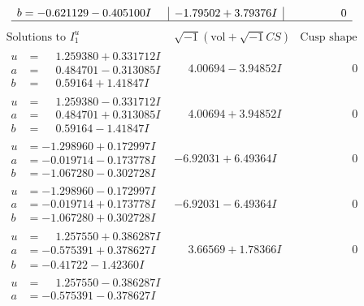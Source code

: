 \documentclass[1p]{elsarticle_modified}
\theoremstyle{definition}
\newcommand{\I}{\sqrt{-1}}
\begin{document}
$$\begin{array}{c|c|c}
\begin{aligned}
b &= -0.621129 - 0.405100 I\end{aligned}
 & -1.79502 + 3.79376 I & \phantom{-0.000000 } 0\\
 \hline 
 \end{array}$$\newpage$$\begin{array}{c|c|c}  
\text{Solutions to }I^u_{1}& \I (\text{vol} + \sqrt{-1}CS) & \text{Cusp shape}\\
 \hline 
\begin{aligned}
u &= \phantom{-}1.259380 + 0.331712 I \\
a &= \phantom{-}0.484701 - 0.313085 I \\
b &= \phantom{-}0.59164 + 1.41847 I\end{aligned}
 & \phantom{-}4.00694 - 3.94852 I & \phantom{-0.000000 } 0 \\ \hline\begin{aligned}
u &= \phantom{-}1.259380 - 0.331712 I \\
a &= \phantom{-}0.484701 + 0.313085 I \\
b &= \phantom{-}0.59164 - 1.41847 I\end{aligned}
 & \phantom{-}4.00694 + 3.94852 I & \phantom{-0.000000 } 0 \\ \hline\begin{aligned}
u &= -1.298960 + 0.172997 I \\
a &= -0.019714 - 0.173778 I \\
b &= -1.067280 - 0.302728 I\end{aligned}
 & -6.92031 + 6.49364 I & \phantom{-0.000000 } 0 \\ \hline\begin{aligned}
u &= -1.298960 - 0.172997 I \\
a &= -0.019714 + 0.173778 I \\
b &= -1.067280 + 0.302728 I\end{aligned}
 & -6.92031 - 6.49364 I & \phantom{-0.000000 } 0 \\ \hline\begin{aligned}
u &= \phantom{-}1.257550 + 0.386287 I \\
a &= -0.575391 + 0.378627 I \\
b &= -0.41722 - 1.42360 I\end{aligned}
 & \phantom{-}3.66569 + 1.78366 I & \phantom{-0.000000 } 0 \\ \hline\begin{aligned}
u &= \phantom{-}1.257550 - 0.386287 I \\
a &= -0.575391 - 0.378627 I \\

\end{aligned}
\end{array}$$
\end{document}
